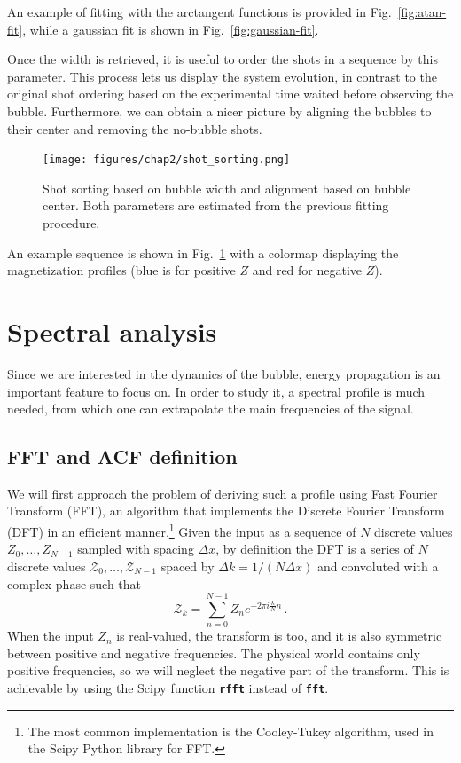 An example of fitting with the arctangent functions is provided in Fig.\ \ref{fig:atan-fit}, while a gaussian fit is shown in Fig.\ \ref{fig:gaussian-fit}.

Once the width is retrieved, it is useful to order the shots in a sequence by this parameter. This process lets us display the system evolution, in contrast to the original shot ordering based on the experimental time waited before observing the bubble. Furthermore, we can obtain a nicer picture by aligning the bubbles to their center and removing the no-bubble shots.
\begin{figure}[t!]
    \centering
    \texttt{[image: figures/chap2/shot\_sorting.png]}
    \caption{Shot sorting based on bubble width and alignment based on bubble center. Both parameters are estimated from the previous fitting procedure.}
    \label{fig:sorting}
\end{figure}
An example sequence is shown in Fig.\ \ref{fig:sorting} with a colormap displaying the magnetization profiles (blue is for positive $Z$ and red for negative $Z$).

\section{Spectral analysis}
Since we are interested in the dynamics of the bubble, energy propagation is an important feature to focus on. In order to study it, a spectral profile is much needed, from which one can extrapolate the main frequencies of the signal. 

\subsection{FFT and ACF definition}
We will first approach the problem of deriving such a profile using Fast Fourier Transform (FFT), an algorithm that implements the Discrete Fourier Transform (DFT) in an efficient manner.\footnote{The most common implementation is the Cooley-Tukey algorithm, used in the Scipy Python library for FFT.} Given the input as a sequence of $N$ discrete values $Z_0,\dots,Z_{N-1}$ sampled with spacing $\Delta x$, by definition the DFT is a series of $N$ discrete values $\mathcal{Z}_0,\dots,\mathcal{Z}_{N-1}$ spaced by $\Delta k = 1/(N\Delta x)$ and convoluted with a complex phase such that
\begin{equation*}
    \mathcal{Z}_k = \sum_{n=0}^{N-1} Z_n e^{-2\pi i \frac{k}{N}n}\, .
\end{equation*}
When the input $Z_n$ is real-valued, the transform is too, and it is also symmetric between positive and negative frequencies. The physical world contains only positive frequencies, so we will neglect the negative part of the transform. This is achievable by using the Scipy function \texttt{\textbf{rfft}} instead of \texttt{\textbf{fft}}.

